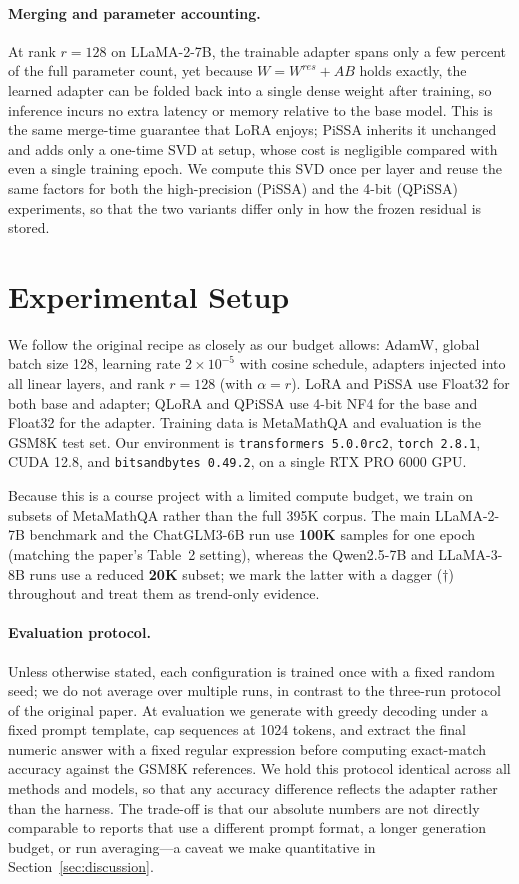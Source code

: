 \documentclass[mlmain]{jmlr}
\begin{document}
\paragraph{Merging and parameter accounting.} At rank $r=128$ on LLaMA-2-7B, the trainable adapter spans only a few percent of the full parameter count, yet because $W = W^{res}+AB$ holds exactly, the learned adapter can be folded back into a single dense weight after training, so inference incurs no extra latency or memory relative to the base model. This is the same merge-time guarantee that LoRA enjoys; PiSSA inherits it unchanged and adds only a one-time SVD at setup, whose cost is negligible compared with even a single training epoch. We compute this SVD once per layer and reuse the same factors for both the high-precision (PiSSA) and the 4-bit (QPiSSA) experiments, so that the two variants differ only in how the frozen residual is stored.

\section{Experimental Setup}
\label{sec:setup}
We follow the original recipe as closely as our budget allows: AdamW, global batch size 128, learning rate $2\times10^{-5}$ with cosine schedule, adapters injected into all linear layers, and rank $r=128$ (with $\alpha=r$). LoRA and PiSSA use Float32 for both base and adapter; QLoRA and QPiSSA use 4-bit NF4 for the base and Float32 for the adapter. Training data is MetaMathQA and evaluation is the GSM8K test set. Our environment is \texttt{transformers 5.0.0rc2}, \texttt{torch 2.8.1}, CUDA 12.8, and \texttt{bitsandbytes 0.49.2}, on a single RTX PRO 6000 GPU.

Because this is a course project with a limited compute budget, we train on subsets of MetaMathQA rather than the full 395K corpus. The main LLaMA-2-7B benchmark and the ChatGLM3-6B run use \textbf{100K} samples for one epoch (matching the paper's Table~2 setting), whereas the Qwen2.5-7B and LLaMA-3-8B runs use a reduced \textbf{20K} subset; we mark the latter with a dagger ($\dagger$) throughout and treat them as trend-only evidence.

\paragraph{Evaluation protocol.} Unless otherwise stated, each configuration is trained once with a fixed random seed; we do not average over multiple runs, in contrast to the three-run protocol of the original paper. At evaluation we generate with greedy decoding under a fixed prompt template, cap sequences at 1024 tokens, and extract the final numeric answer with a fixed regular expression before computing exact-match accuracy against the GSM8K references. We hold this protocol identical across all methods and models, so that any accuracy difference reflects the adapter rather than the harness. The trade-off is that our absolute numbers are not directly comparable to reports that use a different prompt format, a longer generation budget, or run averaging---a caveat we make quantitative in Section~\ref{sec:discussion}.
\end{document}
